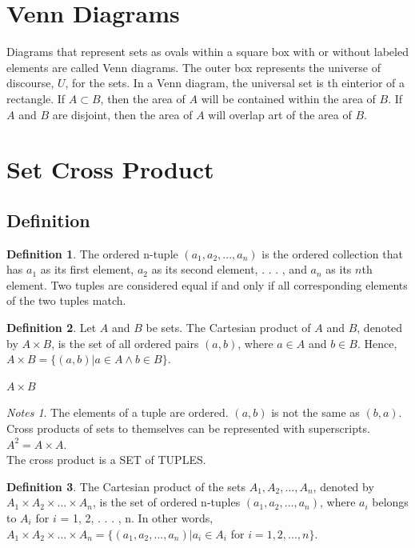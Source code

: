 \documentclass[11pt]{book} %
\theoremstyle {definition}
\newtheorem {definition}{Definition}[section]
\theoremstyle {remark}
\newtheorem*{notes}{Notes}
\begin{document}
\section {Venn Diagrams}
    Diagrams that represent sets as ovals within a square box with or without labeled elements are called Venn diagrams. The outer box represents the universe of discourse, $U$, for the sets.   In a Venn diagram, the universal set is th einterior of a rectangle. If $A \subset B$, then the area of $A$ will be contained within the area of $B$.
If $A$ and $B$ are disjoint, then the area of $A$ will overlap art of the area of $B$.



\section {Set Cross Product}
    \subsection {Definition}
    \begin{definition}
The ordered n-tuple $(a_1, a_2, . . . , a_n)$ is the ordered collection that has $a_1$ as its first element, $a_2$ as its second element, . . . , and $a_n$ as its $n$th element.
Two tuples are considered equal if and only if all corresponding elements of the two tuples match.
    \end{definition}

    \begin{definition}
    Let $A$ and $B$ be sets. The Cartesian product of $A$ and $B$, denoted by $A \times B$, is the set of all
ordered pairs $(a, b)$, where $a \in A$ and $b \in B$. Hence,
$A \times B = \{(a, b) | a \in  A \land b \in B\}$.
    \end{definition}
$A \times B$
\begin{notes}
The elements of a tuple are ordered. $(a,b)$ is not the same as $(b, a)$.\\
Cross products of sets to themselves can be represented with superscripts. $A^2=A \times A$.\\
The cross product is a SET of TUPLES.
\end{notes}

    \begin {definition}
    The Cartesian product of the sets $A_1,A_2, . . . , A_n$, denoted by $A_1 \times A_2 \times \dots \times A_n$, is the
set of ordered n-tuples $(a_1, a_2, . . . , a_n)$, where $a_i$ belongs to $A_i$ for $i$ = 1, 2, . . . , n. In other
words,
$A_1 \times A_2 \times \dots \times A_n = \{(a_1, a_2, . . . , a_n) | a_i \in A_i$ for $i = 1, 2, . . . , n\}$.
    \end {definition}
\end{document}
